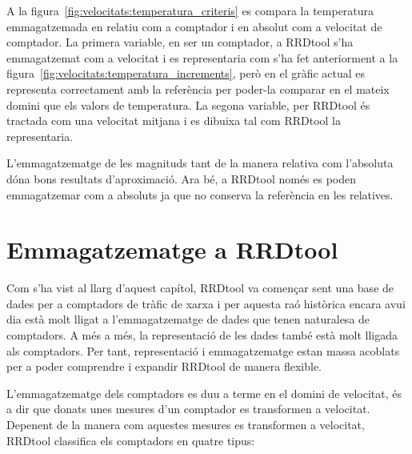 A la figura~\ref{fig:velocitats:temperatura_criteris} es compara la temperatura emmagatzemada en relatiu com a comptador i en absolut com a velocitat de comptador. 
La primera variable, en ser un comptador, a RRDtool s'ha emmagatzemat com a velocitat i es representaria com s'ha fet anteriorment a la figura~\ref{fig:velocitats:temperatura_increments}, però en el gràfic actual es representa correctament amb la referència per poder-la comparar en el mateix domini que els valors de temperatura.
La segona variable, per RRDtool  és tractada com una velocitat mitjana i es dibuixa tal com RRDtool la representaria.

L'emmagatzematge de les magnituds tant de la manera relativa com l'absoluta dóna bons resultats d'aproximació. Ara bé, a RRDtool només es poden emmagatzemar com a absoluts ja que no conserva la referència en les relatives.

\section[RRDtool]{Emmagatzematge a RRDtool}

Com s'ha vist al llarg d'aquest capítol, RRDtool va començar sent una base de dades per a comptadors de tràfic de xarxa i per aquesta raó històrica encara avui dia està molt lligat a l'emmagatzematge de dades que tenen naturalesa de comptadors. A més a més, la representació de les dades també està molt lligada als comptadors. Per tant, representació i emmagatzematge estan massa acoblats per a poder comprendre i expandir RRDtool de manera flexible.

L'emmagatzematge dels comptadors es duu a terme en el domini de velocitat, és a dir que donats unes mesures d'un comptador es transformen a velocitat. Depenent de la manera com aquestes mesures es transformen a velocitat, RRDtool classifica els comptadors en quatre tipus:

